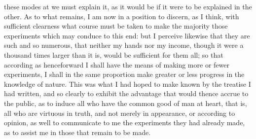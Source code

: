 \documentclass[12pt]{article}
\begin{document}
these modes at we must explain it, as it would be if it were to be explained in the other. As to what remains, I am now in a position to discern, as I think, with sufficient clearness what course must be taken to make the majority those experiments which may conduce to this end: but I perceive likewise that they are such and so numerous, that neither my hands nor my income, though it were a thousand times larger than it is, would be sufficient for them all; so that according as henceforward I shall have the means of making more or fewer experiments, I shall in the same proportion make greater or less progress in the knowledge of nature. This was what I had hoped to make known by the treatise I had written, and so clearly to exhibit the advantage that would thence accrue to the public, as to induce all who have the common good of man at heart, that is, all who are virtuous in truth, and not merely in appearance, or according to opinion, as well to communicate to me the experiments they had already made, as to assist me in those that remain to be made.
\end{document}
